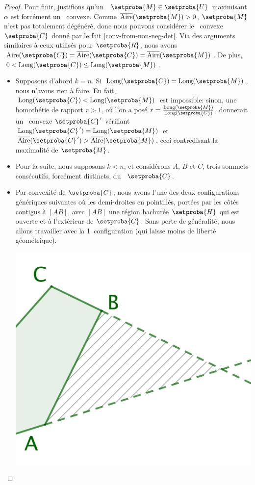 \begin{proof}
    
    Pour finir, justifions qu'un \ncycle\ $\setproba{M} \in \setproba{U}$ maximisant $\alpha$ est forcément un \ngone\ convexe. 
    Comme $\sarea{\setproba{M}} > 0$, $\setproba{M}$ n'est pas totalement dégénéré,
    donc nous pouvons considérer le \kgone\ convexe $\setproba{C}$ donné par le fait \ref{conv-from-non-neg-det}.
    Via des arguments similaires à ceux utilisés pour $\setproba{R}$, 
    nous avons $\area{\setproba{C}} = \sarea{\setproba{C}} = \sarea{\setproba{M}}$.
    De plus,
    $0 < \cyclelen{\setproba{C}} \leq \cyclelen{\setproba{M}}$.
    \begin{itemize}
		\item Supposons d'abord $k = n$.
		Si $\cyclelen{\setproba{C}} = \cyclelen{\setproba{M}}$, nous n'avons rien à faire.
		En fait, $\cyclelen{\setproba{C}} < \cyclelen{\setproba{M}}$ est impossible: 
		sinon, une homothétie de rapport $r > 1$, où l'on a posé $r = \frac{ \cyclelen{\setproba{M}} }{ \cyclelen{\setproba{C}} }$, donnerait un \ngone\ convexe $\primeit{\setproba{C}}$ vérifiant
		$\cyclelen{\primeit{\setproba{C}}} = \cyclelen{\setproba{M}}$
		et
		$\sarea{\primeit{\setproba{C}}} > \sarea{\setproba{M}}$, ceci contredisant la maximalité de $\setproba{M}$.


		\item Pour la suite, nous supposons $k < n$, et considérons $A$, $B$ et $C$, trois sommets consécutifs, forcément distincts, du \kgone\ $\setproba{C}$. 


		\item Par convexité de $\setproba{C}$, nous avons l'une des deux configurations génériques suivantes où les demi-droites en pointillés, portées par les côtés contigus à $[AB]$,  avec $[AB]$ une région hachurée $\setproba{H}$ qui est ouverte et à l'extérieur de $\setproba{C}$. 
		Sans perte de généralité, nous allons travailler avec la 1\iere\ configuration (qui laisse moins de liberté géométrique).
		\begin{multicols}{2}
			\centering

			\includegraphics[scale=.35]{content/polygon/at-least-one/add-vertex-1.png}


\end{multicols}
\end{itemize}
\end{proof}
